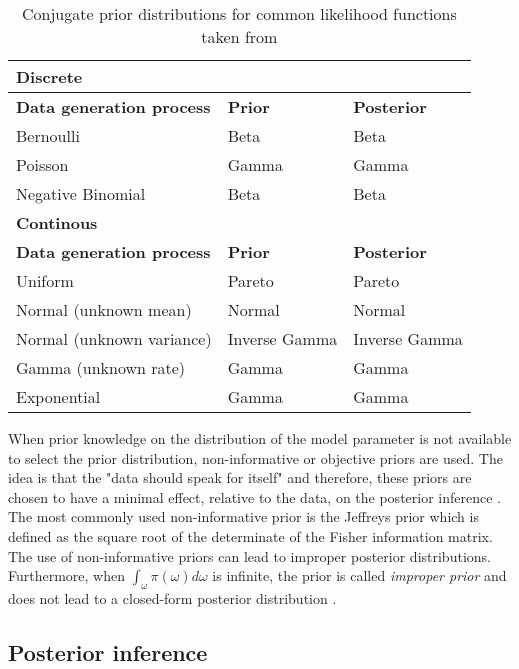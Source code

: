 \begin{table}[hb	]
\centering
\caption{Conjugate prior distributions for common likelihood functions taken from \citep{Fink1997}}
\label{tab0:priors}
\begin{tabular}{l l l}
\toprule
\textbf{Discrete} & &\\
\midrule
\midrule
\textbf{Data generation process} & \textbf{Prior} & \textbf{Posterior} \\ 
\midrule 
Bernoulli & Beta & Beta \\
Poisson & Gamma  & Gamma \\
Negative Binomial & Beta & Beta \\
\midrule
\midrule
\textbf{Continous} & & \\
\midrule
\midrule
\textbf{Data generation process} & \textbf{Prior} & \textbf{Posterior} \\ 
\midrule
Uniform  & Pareto & Pareto \\ 
Normal (unknown mean) &  Normal  & Normal \\ 
Normal (unknown variance) &  Inverse Gamma  & Inverse Gamma \\ 
Gamma (unknown rate) &  Gamma  & Gamma \\ 
Exponential &  Gamma  & Gamma \\ 
\bottomrule
\end{tabular}
\end{table} 

When prior knowledge on the distribution of the model parameter is not available to select the prior distribution, non-informative or objective priors are used. The idea is that the "data should speak for itself" and therefore, these priors are chosen to have a minimal effect, relative to the data, on the posterior inference \citep{Bernardo2000}. The most commonly used non-informative prior is the Jeffreys prior \citep{Jeffreys1946} which is defined as the square root of the determinate of the Fisher information matrix. The use of non-informative priors can lead to improper posterior distributions. Furthermore, when $\int_\omega\pi(\omega)d\omega$ is infinite, the prior is called \emph{improper prior} and does not lead to a closed-form posterior distribution \citep{Bernardo2003}.

\subsection{Posterior inference}

\\

